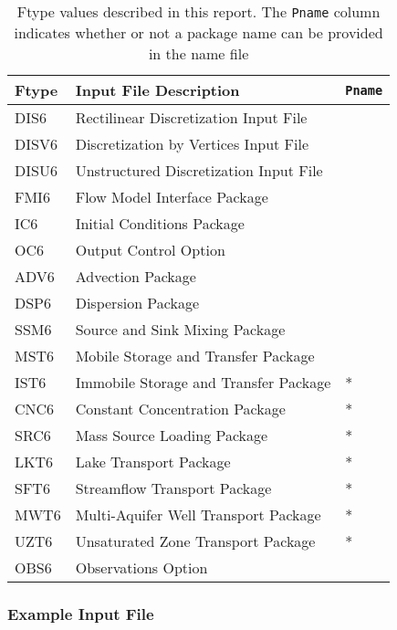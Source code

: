 \begin{table}[H]
\caption{Ftype values described in this report.  The \texttt{Pname} column indicates whether or not a package name can be provided in the name file}
\small
\begin{center}
\begin{tabular*}{\columnwidth}{l l l}
\hline
\hline
Ftype & Input File Description & \texttt{Pname}\\
\hline
DIS6 & Rectilinear Discretization Input File \\
DISV6 & Discretization by Vertices Input File \\
DISU6 & Unstructured Discretization Input File \\
FMI6 & Flow Model Interface Package &  \\ 
IC6 & Initial Conditions Package \\
OC6 & Output Control Option \\
ADV6 & Advection Package \\ 
DSP6 & Dispersion Package \\ 
SSM6 & Source and Sink Mixing Package \\ 
MST6 & Mobile Storage and Transfer Package \\
IST6 & Immobile Storage and Transfer Package & * \\
CNC6 & Constant Concentration Package & * \\ 
SRC6 & Mass Source Loading Package & * \\ 
LKT6 & Lake Transport Package & * \\ 
SFT6 & Streamflow Transport Package & * \\ 
MWT6 & Multi-Aquifer Well Transport Package & * \\ 
UZT6 & Unsaturated Zone Transport Package & * \\ 
OBS6 & Observations Option \\
\hline 
\end{tabular*}
\label{table:ftype}
\end{center}
\normalsize
\end{table}

\vspace{5mm}
\subsubsection{Example Input File}


